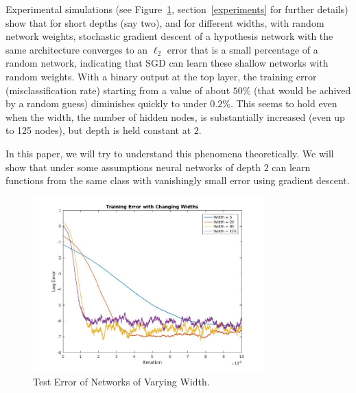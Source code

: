 Experimental simulations  (see Figure~\ref{expconverge}, section~\ref{experiments} for further details) show that for short depths (say two), and for different widths, with random network weights, stochastic gradient descent of a hypothesis network with the same architecture converges to an $\ell_2$ error that is a small percentage of a random network, indicating that SGD can learn these shallow networks with random weights.  With a binary output at the top layer, the training error (misclassification rate) starting from a value of about $50\%$ (that would be achived by a random guess) diminishes  quickly to under $0.2\%$. This seems to hold even when the width, the number of hidden nodes, is substantially increased (even up to 125 nodes), but depth is held constant at $2$. 

In this paper, we will try to understand this phenomena theoretically. We will show that under some assumptions neural networks of depth $2$ can learn functions from the same class with vanishingly small error using gradient descent.

\begin{figure}[h]\label{expconverge}
\centering
\includegraphics[width = 3.5in]{plotChangeWidth.jpg}
\caption{Test Error of Networks of Varying Width.}
\end{figure}




